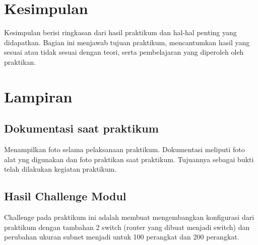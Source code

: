 \section{Kesimpulan}
Kesimpulan berisi ringkasan dari hasil praktikum dan hal-hal penting yang didapatkan. Bagian ini menjawab tujuan praktikum, mencantumkan hasil yang sesuai atau tidak sesuai dengan teori, serta pembelajaran yang diperoleh oleh praktikan.

\section{Lampiran}
\subsection{Dokumentasi saat praktikum}
Menampilkan foto selama pelaksanaan praktikum. Dokumentasi meliputi foto alat yng digunakan dan foto praktikan saat praktikum. Tujuannya sebagai bukti telah dilakukan kegiatan praktikum.

\subsection{Hasil Challenge Modul}
Challenge pada praktikum ini adalah membuat mengembangkan konfigurasi dari praktikum dengan tambahan 2 switch (router yang dibuat menjadi switch) dan perubahan ukuran subnet menjadi untuk 100 perangkat dan 200 perangkat. 
